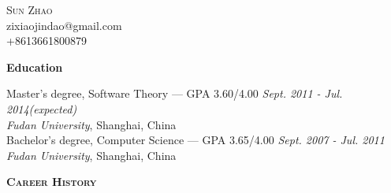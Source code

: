 \documentclass[9pt]{article}
\newenvironment{changemargin}[2]{%
  \begin{list}{}{%
    \setlength{\topsep}{0pt}%
    \setlength{\leftmargin}{#1}%
    \setlength{\rightmargin}{#2}%
    \setlength{\listparindent}{\parindent}%
    \setlength{\itemindent}{\parindent}%
    \setlength{\parsep}{\parskip}%
  }%
  \item[]}{\end{list}
}
\newcommand{\lineover}{
	\begin{changemargin}{-0.05in}{-0.05in}
		\vspace*{-8pt}
		\hrulefill \\
		\vspace*{-2pt}
	\end{changemargin}
}
\newcommand{\header}[1]{
	\begin{changemargin}{-0.5in}{-0.5in}
		\scshape{#1}\\
  	\lineover
	\end{changemargin}
}
\newcommand{\contact}[4]{
	\begin{changemargin}{-0.5in}{-0.5in}
		\begin{center}
			{\Large \scshape {#1}}\\ \smallskip
			{#2}\\ \smallskip
			{#3}\\ \smallskip
			{#4}\smallskip
		\end{center}
	\end{changemargin}
}
\newenvironment{body} {
	\vspace*{-16pt}
	\begin{changemargin}{-0.25in}{-0.5in}
  }	
	{\end{changemargin}
}
\begin{document}
\thispagestyle{empty}
\contact{Sun Zhao}{zixiaojindao@gmail.com}{+8613661800879}


%
%


\header{\textbf{Education}}

\begin{body}
	\vspace{14pt}
	Master's degree, Software Theory --- GPA 3.60/4.00 \hfill \emph{Sept. 2011 - Jul. 2014(expected)} \\
	\emph{Fudan University}, Shanghai, China \\
  \medskip
	Bachelor's degree, Computer Science --- GPA 3.65/4.00 \hfill \emph{Sept. 2007 - Jul. 2011} \\
	\emph{Fudan University}, Shanghai, China\\
\end{body}

\smallskip


\header{\textbf{Career History}}
\end{document}
